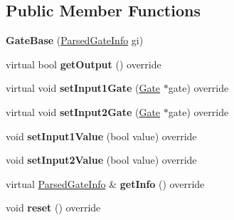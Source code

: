 \subsection*{Public Member Functions}
\begin{DoxyCompactItemize}
\item 
{\bfseries Gate\+Base} (\hyperlink{structParsedGateInfo}{Parsed\+Gate\+Info} gi)\hypertarget{classGateBase_a5ec2f5219f1ec0f0002d264db11bf745}{}\label{classGateBase_a5ec2f5219f1ec0f0002d264db11bf745}

\item 
virtual bool {\bfseries get\+Output} () override\hypertarget{classGateBase_a8ff8ed8755b4ced0720e06701096f305}{}\label{classGateBase_a8ff8ed8755b4ced0720e06701096f305}

\item 
virtual void {\bfseries set\+Input1\+Gate} (\hyperlink{classGate}{Gate} $\ast$gate) override\hypertarget{classGateBase_a84a24d217863884116bfb22875d53e93}{}\label{classGateBase_a84a24d217863884116bfb22875d53e93}

\item 
virtual void {\bfseries set\+Input2\+Gate} (\hyperlink{classGate}{Gate} $\ast$gate) override\hypertarget{classGateBase_a3f024c6d9c20707cfc03718212008ca8}{}\label{classGateBase_a3f024c6d9c20707cfc03718212008ca8}

\item 
void {\bfseries set\+Input1\+Value} (bool value) override\hypertarget{classGateBase_aec64af0bb8332a0b6623947fa707fcee}{}\label{classGateBase_aec64af0bb8332a0b6623947fa707fcee}

\item 
void {\bfseries set\+Input2\+Value} (bool value) override\hypertarget{classGateBase_a142ad39848cf2e9ccd702c51a8cf7042}{}\label{classGateBase_a142ad39848cf2e9ccd702c51a8cf7042}

\item 
virtual \hyperlink{structParsedGateInfo}{Parsed\+Gate\+Info} \& {\bfseries get\+Info} () override\hypertarget{classGateBase_aec4a5aa00d1d2546ba690d9c9a6a6706}{}\label{classGateBase_aec4a5aa00d1d2546ba690d9c9a6a6706}

\item 
void {\bfseries reset} () override\hypertarget{classGateBase_a3d27538a156386eed5eb78f99621fd35}{}\label{classGateBase_a3d27538a156386eed5eb78f99621fd35}

\end{DoxyCompactItemize}
